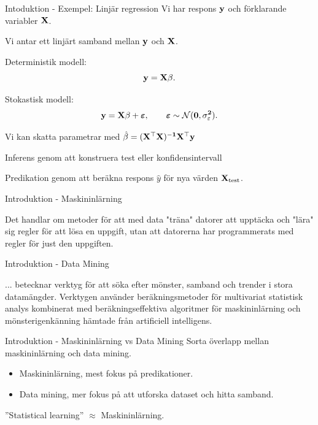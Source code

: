 \documentclass[10pt,english]{beamer}
\begin{document}
\begin{frame}{Intoduktion - Exempel: Linjär regression}
    Vi har respons $\bf{y}$ och förklarande variabler $\bf{X}$.

    Vi antar ett linjärt samband mellan $\bf{y}$ och $\bf{X}$.

    Deterministik modell:
    \begin{equation*}
        \bf{y} = \bf{X} \beta.
    \end{equation*}

    Stokastisk modell:
    \begin{equation*}
        \bf{y} = \bf{X} \beta + \boldsymbol{\varepsilon}, \qquad \boldsymbol{\varepsilon} \sim \mathcal{N}(0, \sigma^2_{\varepsilon}).
    \end{equation*}

    Vi kan skatta parametrar med $\hat{\beta} = (\bf{X}^\top \bf{X})^{-1}\bf{X}^{\top} \bf{y}$

    Inferens genom att konstruera test eller konfidensintervall

    Predikation genom att beräkna respons $\hat{y}$ för nya värden $\bf{X}_{\text{test}}$.
\end{frame}

\begin{frame}{Introduktion - Maskininlärning}
    \begin{bluebox}
        Det handlar om metoder för att med data "träna" datorer att upptäcka och "lära" sig regler för att lösa en uppgift, utan att datorerna har programmerats med regler för just den uppgiften.
    \end{bluebox}
\end{frame}

\begin{frame}{Introduktion - Data Mining}
    \begin{bluebox}
        ... betecknar verktyg för att söka efter mönster, samband och trender i stora datamängder. Verktygen använder beräkningsmetoder för multivariat statistisk analys kombinerat med beräkningseffektiva algoritmer för maskininlärning och mönsterigenkänning hämtade från artificiell intelligens.
    \end{bluebox}
\end{frame}

\begin{frame}{Introduktion - Maskininlärning vs Data Mining}
    Sorta överlapp mellan maskininlärning och data mining.
    \begin{itemize}
        \item Maskininlärning, mest fokus på predikationer.
        \item Data mining, mer fokus på att utforska dataset och hitta samband.
    \end{itemize}
    ''Statistical learning'' $\approx$ Maskininlärning.
\end{frame}
\end{document}

